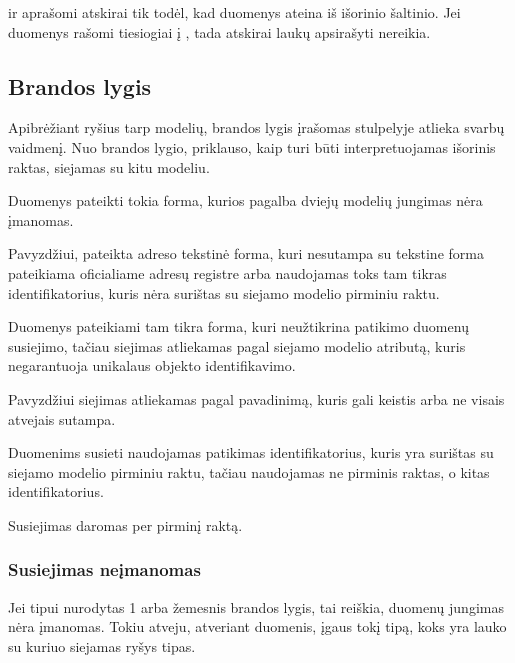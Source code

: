 \documentclass[letterpaper,10pt,lithuanian]{sphinxmanual}
\begin{document}
\sphinxAtStartPar
{} ir  aprašomi atskirai tik todėl, kad duomenys
ateina iš išorinio šaltinio. Jei duomenys rašomi tiesiogiai į , tada atskirai  laukų apsirašyti nereikia.


\subsection{Brandos lygis}
\label{\detokenize{identifikatoriai:brandos-lygis}}\label{\detokenize{identifikatoriai:ref-level}}
\sphinxAtStartPar
Apibrėžiant ryšius tarp modelių, brandos lygis įrašomas {\hyperref[\detokenize{formatas:level}]{}}
stulpelyje atlieka svarbų vaidmenį. Nuo brandos lygio, priklauso, kaip turi būti
interpretuojamas išorinis raktas, siejamas su kitu modeliu.
\begin{description}
\sphinxAtStartPar
Duomenys pateikti tokia forma, kurios pagalba dviejų modelių jungimas nėra
įmanomas.

\sphinxAtStartPar
Pavyzdžiui, pateikta adreso tekstinė forma, kuri nesutampa su tekstine
forma pateikiama oficialiame adresų registre arba naudojamas toks tam
tikras identifikatorius, kuris nėra surištas su siejamo modelio pirminiu
raktu.

\sphinxAtStartPar
Duomenys pateikiami tam tikra forma, kuri neužtikrina patikimo duomenų
susiejimo, tačiau siejimas atliekamas pagal siejamo modelio atributą, kuris
negarantuoja unikalaus objekto identifikavimo.

\sphinxAtStartPar
Pavyzdžiui siejimas atliekamas pagal pavadinimą, kuris gali keistis arba ne
visais atvejais sutampa.

\sphinxAtStartPar
Duomenims susieti naudojamas patikimas identifikatorius, kuris yra surištas su
siejamo modelio pirminiu raktu, tačiau naudojamas ne pirminis raktas, o
kitas identifikatorius.

\sphinxAtStartPar
Susiejimas daromas per pirminį raktą.

\end{description}


\subsubsection{Susiejimas neįmanomas}
\label{\detokenize{identifikatoriai:susiejimas-neimanomas}}
\sphinxAtStartPar
Jei  tipui nurodytas 1 arba žemesnis brandos lygis, tai reiškia, duomenų
jungimas nėra įmanomas. Tokiu atveju, atveriant duomenis,  įgaus tokį
tipą, koks yra lauko su kuriuo siejamas ryšys tipas.
\end{document}
